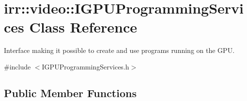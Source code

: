 \hypertarget{classirr_1_1video_1_1IGPUProgrammingServices}{}\section{irr\+:\+:video\+:\+:I\+G\+P\+U\+Programming\+Services Class Reference}
\label{classirr_1_1video_1_1IGPUProgrammingServices}


Interface making it possible to create and use programs running on the G\+PU.  




{\ttfamily \#include $<$I\+G\+P\+U\+Programming\+Services.\+h$>$}

\subsection*{Public Member Functions}
